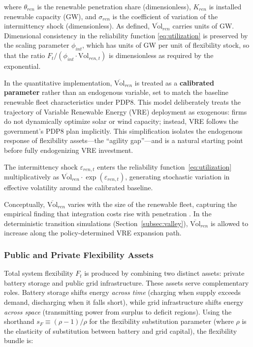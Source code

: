 \documentclass[12pt, a4paper]{article}
\begin{document}
where $\theta_{ren}$ is the renewable penetration share (dimensionless), $K_{ren}$ is installed renewable capacity (GW), and $\sigma_{ren}$ is the coefficient of variation of the intermittency shock (dimensionless). As defined, $\overline{\text{Vol}}_{ren}$ carries units of GW. Dimensional consistency in the reliability function \eqref{eq:utilization} is preserved by the scaling parameter $\phi_{int}$, which has units of GW per unit of flexibility stock, so that the ratio $F_t / (\phi_{int} \cdot \text{Vol}_{ren,t})$ is dimensionless as required by the exponential.

In the quantitative implementation, $\overline{\text{Vol}}_{ren}$ is treated as a \textbf{calibrated parameter} rather than an endogenous variable, set to match the baseline renewable fleet characteristics under PDP8. This model deliberately treats the trajectory of Variable Renewable Energy (VRE) deployment as exogenous: firms do not dynamically optimize solar or wind capacity; instead, VRE follows the government's PDP8 plan implicitly. This simplification isolates the endogenous response of flexibility assets---the ``agility gap''---and is a natural starting point before fully endogenizing VRE investment.

The intermittency shock $\varepsilon_{ren,t}$ enters the reliability function~\eqref{eq:utilization} multiplicatively as $\overline{\text{Vol}}_{ren} \cdot \exp(\varepsilon_{ren,t})$, generating stochastic variation in effective volatility around the calibrated baseline.

Conceptually, $\overline{\text{Vol}}_{ren}$ varies with the size of the renewable fleet, capturing the empirical finding that integration costs rise with penetration \citep{hirth2013}. In the deterministic transition simulations (Section~\ref{subsec:valley}), $\overline{\text{Vol}}_{ren}$ is allowed to increase along the policy-determined VRE expansion path.

\subsubsection{Public and Private Flexibility Assets}

Total system flexibility $F_t$ is produced by combining two distinct assets: private battery storage and public grid infrastructure. These assets serve complementary roles. Battery storage shifts energy \textit{across time} (charging when supply exceeds demand, discharging when it falls short), while grid infrastructure shifts energy \textit{across space} (transmitting power from surplus to deficit regions). Using the shorthand $s_F \equiv (\rho - 1)/\rho$ for the flexibility substitution parameter (where $\rho$ is the elasticity of substitution between battery and grid capital), the flexibility bundle is:
\end{document}
